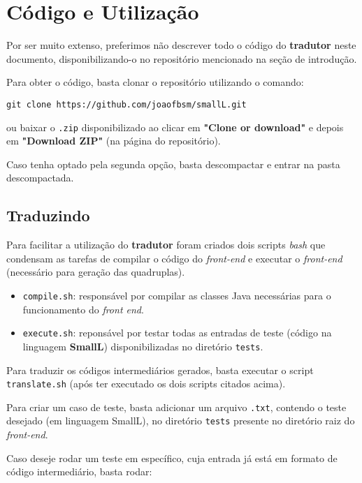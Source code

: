 \section{Código e Utilização}

Por ser muito extenso, preferimos não descrever todo o código do \textbf{tradutor} neste documento, disponibilizando-o no repositório mencionado na seção de introdução.

Para obter o código, basta clonar o repositório utilizando o comando:

\begin{lstlisting}
git clone https://github.com/joaofbsm/smallL.git
\end{lstlisting}

ou baixar o \texttt{.zip} disponibilizado ao clicar em \textbf{"Clone or download"} e depois em \textbf{"Download ZIP"} (na página do repositório).

Caso tenha optado pela segunda opção, basta descompactar e entrar na pasta descompactada.

\subsection{Traduzindo}
Para facilitar a utilização do \textbf{tradutor} foram criados dois scripts \textit{bash} que condensam as tarefas de compilar o código do \textit{front-end}  e executar o \textit{front-end} (necessário para geração das quadruplas).

\begin{itemize}
\item \texttt{compile.sh}: responsável por compilar as classes Java necessárias para o funcionamento do \textit{front end}.
\item \texttt{execute.sh}: reponsável por testar todas as entradas de teste (código na linguagem \textbf{SmallL}) disponibilizadas no diretório \texttt{tests}.
\end{itemize}

Para traduzir os códigos intermediários gerados, basta executar o script \texttt{translate.sh} (após ter executado os dois scripts citados acima).

Para criar um caso de teste, basta adicionar um arquivo \texttt{.txt}, contendo o teste desejado (em linguagem SmallL), no diretório \texttt{tests} presente no diretório raiz do \textit{front-end}.

Caso deseje rodar um teste em específico, cuja entrada já está em formato de código intermediário, basta rodar:

